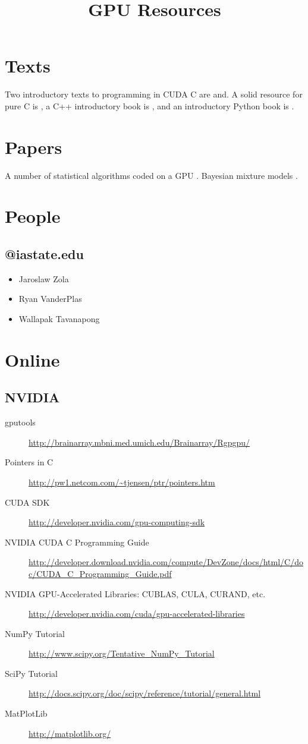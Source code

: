 \documentclass{article}
\title{GPU Resources}
\begin{document}
 

\section{Texts}

Two introductory texts to programming in CUDA C are \cite{sanders2010cuda} and\cite{kirk2010programming}. A solid resource for pure C is \cite{kernighan}, a C++ introductory book is \cite{Savitch}, and an introductory Python book is \cite{beazley}.

\section{Papers}

A number of statistical algorithms coded on a GPU \citep{lee2010utility}. Bayesian mixture models \citep{suchard2010understanding}.

\section{People}

\subsection{@iastate.edu}

\begin{itemize}
\item Jaroslaw Zola
\item Ryan VanderPlas
\item Wallapak Tavanapong
\end{itemize}

\section{Online}

\subsection{NVIDIA}

\begin{description}
\item[gputools] \url{http://brainarray.mbni.med.umich.edu/Brainarray/Rgpgpu/}
\item[Pointers in C] \url{http://pw1.netcom.com/~tjensen/ptr/pointers.htm}
\item[CUDA SDK] \url{http://developer.nvidia.com/gpu-computing-sdk} 
\item[NVIDIA CUDA C Programming Guide] \url{http://developer.download.nvidia.com/compute/DevZone/docs/html/C/doc/CUDA_C_Programming_Guide.pdf}
\item[NVIDIA GPU-Accelerated Libraries: CUBLAS, CULA, CURAND, etc.] \url{http://developer.nvidia.com/cuda/gpu-accelerated-libraries}
\item[NumPy Tutorial] \url{http://www.scipy.org/Tentative\_NumPy\_Tutorial}
\item[SciPy Tutorial] \url{http://docs.scipy.org/doc/scipy/reference/tutorial/general.html}
\item[MatPlotLib] \url{http://matplotlib.org/}
\end{description}





\end{document}
